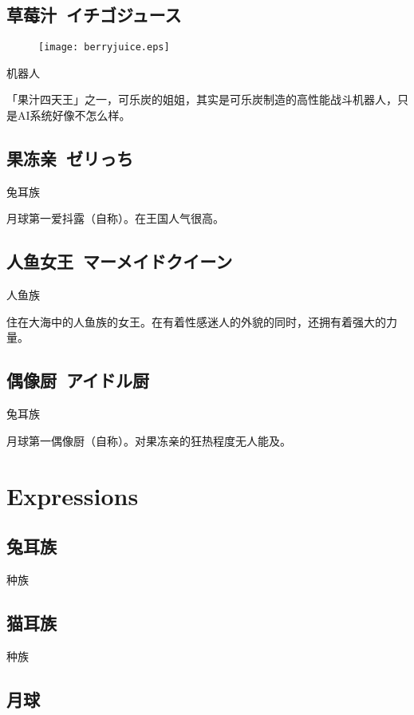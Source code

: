 \documentclass{article}
\begin{document}
\subsection{草莓汁\ イチゴジュース}

\begin{figure}[H]
\centering
\texttt{[image: berryjuice.eps]}
\end{figure}

机器人

「果汁四天王」之一，可乐炭的姐姐，其实是可乐炭制造的高性能战斗机器人，只是AI系统好像不怎么样。

\subsection{果冻亲\ ゼリっち}

兔耳族

月球第一爱抖露（自称）。在王国人气很高。

\subsection{人鱼女王\ マーメイドクイーン}

人鱼族

住在大海中的人鱼族的女王。在有着性感迷人的外貌的同时，还拥有着强大的力量。

\subsection{偶像厨\ アイドル厨}

兔耳族

月球第一偶像厨（自称）。对果冻亲的狂热程度无人能及。

\section{Expressions}

\subsection{兔耳族}

种族

\subsection{猫耳族}

种族

\subsection{月球}
\end{document}
